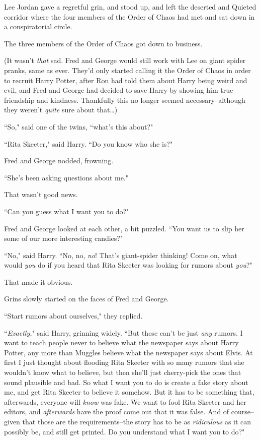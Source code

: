Lee Jordan gave a regretful grin, and stood up, and left the deserted and Quieted corridor where the four members of the Order of Chaos had met and sat down in a conspiratorial circle.

The three members of the Order of Chaos got down to business.

(It wasn't \emph{that} sad. Fred and George would still work with Lee on giant spider pranks, same as ever. They'd only started calling it the Order of Chaos in order to recruit Harry Potter, after Ron had told them about Harry being weird and evil, and Fred and George had decided to save Harry by showing him true friendship and kindness. Thankfully this no longer seemed necessary\---although they weren't \emph{quite} sure about that{\ldots})

``So," said one of the twins, ``what's this about?"

``Rita Skeeter," said Harry. ``Do you know who she is?"

Fred and George nodded, frowning.

``She's been asking questions about me."

That wasn't good news.

``Can you guess what I want you to do?"

Fred and George looked at each other, a bit puzzled. ``You want us to slip her some of our more interesting candies?"

``No," said Harry. ``No, no, \emph{no}! That's giant-spider thinking! Come on, what would \emph{you} do if you heard that Rita Skeeter was looking for rumors about \emph{you}?"

That made it obvious.

Grins slowly started on the faces of Fred and George.

``Start rumors about ourselves," they replied.

``\emph{Exactly,}" said Harry, grinning widely. ``But these can't be just \emph{any} rumors. I want to teach people never to believe what the newspaper says about Harry Potter, any more than Muggles believe what the newspaper says about Elvis. At first I just thought about flooding Rita Skeeter with so many rumors that she wouldn't know what to believe, but then she'll just cherry-pick the ones that sound plausible and bad. So what I want you to do is create a fake story about me, and get Rita Skeeter to believe it somehow. But it has to be something that, afterwards, everyone will \emph{know} was fake. We want to fool Rita Skeeter and her editors, and \emph{afterwards} have the proof come out that it was false. And of course\---given that those are the requirements\---the story has to be as \emph{ridiculous} as it can possibly be, and still get printed. Do you understand what I want you to do?"

